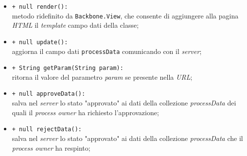 \begin{flushleft}
\begin{itemize}
\begin{sloppypar}
\begin{itemize}
\item \texttt{+ null render():}\\ metodo ridefinito da \texttt{Backbone.View}, che consente di aggiungere alla pagina \textit{HTML} il \textit{template} campo dati della classe;
\item \texttt{+ null update():}\\ aggiorna il campo dati \texttt{processData} comunicando con il \textit{server};
\item \texttt{+ String getParam(String param):}\\ ritorna il valore del parametro \textit{param} se presente nella \textit{URL};
\item \texttt{+ null approveData():}\\ salva nel \textit{server} lo stato "approvato" ai dati della collezione \textit{processData} dei quali il \textit{process owner} ha richiesto l'approvazione;
\item \texttt{+ null rejectData():}\\ salva nel \textit{server} lo stato "approvato" ai dati della collezione \textit{processData} che il \textit{process owner} ha respinto;
\end{itemize}
\end{sloppypar}
\end{itemize}
\end{flushleft}